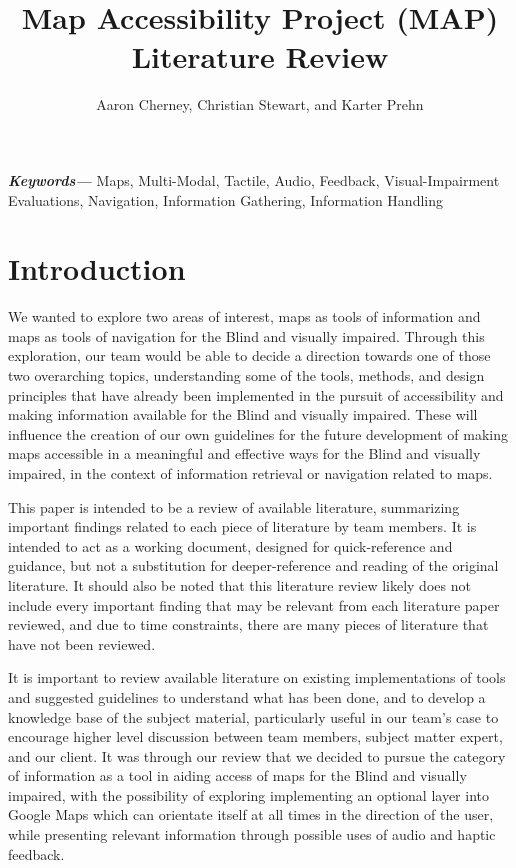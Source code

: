\documentclass{article}
\title{Map Accessibility Project (MAP) Literature Review}
\author{Aaron Cherney, Christian Stewart, and Karter Prehn}
\providecommand{\keywords}[1]
{
  \small	
  \textbf{\textit{Keywords---}} #1
}
\begin{document}
\maketitle

\keywords{Maps, Multi-Modal, Tactile, Audio, Feedback, Visual-Impairment Evaluations, Navigation, Information Gathering, Information Handling}

\section{Introduction}

\par We wanted to explore two areas of interest, maps as tools of information and maps as tools of navigation for the Blind and visually impaired. Through this exploration, our team would be able to decide a direction towards one of those two overarching topics, understanding some of the tools, methods, and design principles that have already been implemented in the pursuit of accessibility and making information available for the Blind and visually impaired. These will influence the creation of our own guidelines for the future development of making maps accessible in a meaningful and effective ways for the Blind and visually impaired, in the context of information retrieval or navigation related to maps.
\newline
\par This paper is intended to be a review of available literature, summarizing important findings related to each piece of literature by team members. It is intended to act as a working document, designed for quick-reference and guidance, but not a substitution for deeper-reference and reading of the original literature. It should also be noted that this literature review likely does not include every important finding that may be relevant from each literature paper reviewed, and due to time constraints, there are many pieces of literature that have not been reviewed. 
\newline
\par It is important to review available literature on existing implementations of tools and suggested guidelines to understand what has been done, and to develop a knowledge base of the subject material, particularly useful in our team’s case to encourage higher level discussion between team members, subject matter expert, and our client. It was through our review that we decided to pursue the category of information as a tool in aiding access of maps for the Blind and visually impaired, with the possibility of exploring implementing an optional layer into Google Maps which can orientate itself at all times in the direction of the user, while presenting relevant information through possible uses of audio and haptic feedback.  
\end{document}

